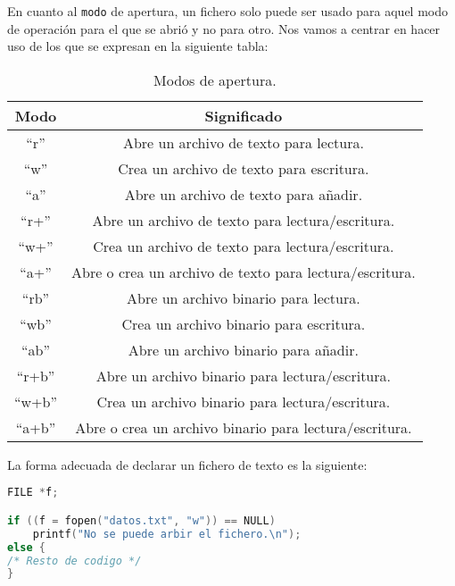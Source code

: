 {En cuanto al \texttt{modo} de apertura, un fichero solo puede ser usado para aquel modo de operación para el que se abrió y no para otro. Nos vamos a centrar en hacer uso de los que se expresan en la siguiente tabla:
\begin{table}[htbp]
	\begin{center}
		\begin{tabular}{|c|c|}
			\hline 
			\textbf{Modo} & \textbf{Significado}  \\
			\hline
			``r'' & Abre un archivo de texto para lectura.\\ \hline
			``w'' & Crea un archivo de texto para escritura.\\ \hline
			``a'' & Abre un archivo de texto para añadir.\\ \hline
			``r+'' & Abre un archivo de texto para lectura/escritura. \\ \hline
			``w+'' & Crea un archivo de texto para lectura/escritura.\\ \hline
			``a+'' & Abre o crea un archivo de texto para lectura/escritura.\\ \hline
			``rb'' & Abre un archivo binario para lectura.\\ \hline
			``wb'' & Crea un archivo binario para escritura.\\ \hline
			``ab'' & Abre un archivo binario para añadir.\\ \hline
			``r+b'' & Abre un archivo binario para lectura/escritura.\\ \hline
			``w+b'' & Crea un archivo binario para lectura/escritura.\\ \hline
			``a+b'' & Abre o crea un archivo binario para lectura/escritura.\\ \hline
		\end{tabular}
		\caption{Modos de apertura.}
		\label{tabla:Modos de apertura}
	\end{center}
\end{table}

La forma adecuada de declarar un fichero de texto es la siguiente:
\begin{lstlisting}[language=C]
FILE *f;

if ((f = fopen("datos.txt", "w")) == NULL)
    printf("No se puede arbir el fichero.\n");
else {
/* Resto de codigo */
}
\end{lstlisting}
}
